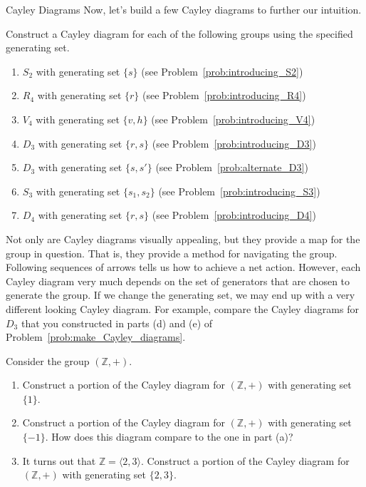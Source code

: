 \begin{section}{Cayley Diagrams}
Now, let's build a few Cayley diagrams to further our intuition.

\begin{problem}\label{prob:make_Cayley_diagrams}
Construct a Cayley diagram for each of the following groups using the specified generating set.
\begin{enumerate}[label=\textrm{(\alph*)}]
\item \label{cayley:S2} $S_2$ with generating set $\{s\}$ (see Problem~\ref{prob:introducing_S2})
\item \label{cayley:R4} $R_4$ with generating set $\{r\}$ (see Problem~\ref{prob:introducing_R4})
\item \label{cayley:V4} $V_4$ with generating set $\{v,h\}$ (see Problem~\ref{prob:introducing_V4})
\item \label{cayley:D3} $D_3$ with generating set $\{r,s\}$ (see Problem~\ref{prob:introducing_D3})
\item \label{cayley:altD3} $D_3$ with generating set $\{s,s'\}$ (see Problem~\ref{prob:alternate_D3})
\item \label{cayley:S3} $S_3$ with generating set $\{s_1,s_2\}$ (see Problem~\ref{prob:introducing_S3})
\item \label{cayley:D4} $D_4$ with generating set $\{r,s\}$ (see Problem~\ref{prob:introducing_D4})
\end{enumerate}
\end{problem}

Not only are Cayley diagrams visually appealing, but they provide a map for the group in question.  That is, they provide a method for navigating the group.  Following sequences of arrows tells us how to achieve a net action.  However, each Cayley diagram very much depends on the set of generators that are chosen to generate the group.  If we change the generating set, we may end up with a very different looking Cayley diagram. For example, compare the Cayley diagrams for $D_3$ that you constructed in parts (d) and (e) of Problem~\ref{prob:make_Cayley_diagrams}.


\begin{problem}
Consider the group $(\mathbb{Z},+)$.
\begin{enumerate}[label=\textrm{(\alph*)}]
\item Construct a portion of the Cayley diagram for $(\mathbb{Z},+)$ with generating set $\{1\}$.
\item Construct a portion of the Cayley diagram for $(\mathbb{Z},+)$ with generating set $\{-1\}$. How does this diagram compare to the one in part (a)?
\item It turns out that $\mathbb{Z}=\langle 2,3\rangle$. Construct a portion of the Cayley diagram for $(\mathbb{Z},+)$ with generating set $\{2,3\}$.
\end{enumerate}
\end{problem}


\end{section}
